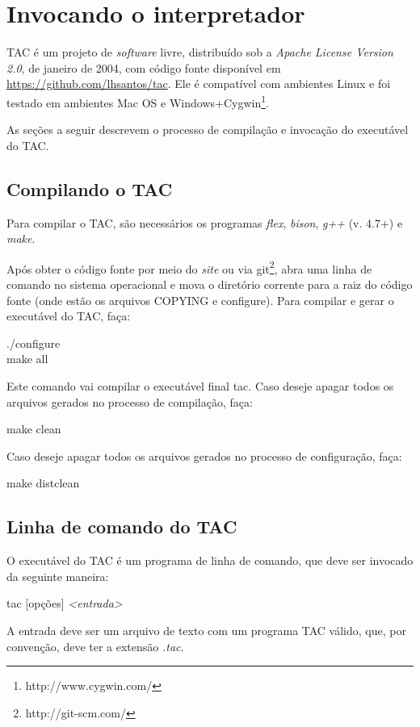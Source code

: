 \documentclass[12pt,a4paper,extrafontsizes,article]{memoir}
\newcommand*{\srcfont}{\fontfamily{pcr}\selectfont}
\begin{document}
\clearpage
\chapter{Invocando o interpretador}

TAC é um projeto de \textit{software} livre, distribuído sob a \textit{Apache License Version 2.0}, de
janeiro de 2004, com código fonte disponível em \url{https://github.com/lhsantos/tac}. Ele é compatível com
ambientes Linux e foi testado em ambientes Mac OS e Windows+Cygwin\footnote{http://www.cygwin.com/}.

As seções a seguir descrevem o processo de compilação e invocação do executável do TAC.

\section{Compilando o TAC}

Para compilar o TAC, são necessários os programas \textit{flex}, \textit{bison}, \textit{g++} (v. 4.7+) e \textit{make}.

Após obter o código fonte por meio do \textit{site} ou via {\srcfont git}\footnote{http://git-scm.com/}, abra uma linha
de comando no sistema operacional e mova o diretório corrente para a raiz do código fonte (onde estão os arquivos
{\srcfont COPYING} e {\srcfont configure}). Para compilar e gerar o executável do TAC, faça:

\bigskip
{\srcfont
./configure\\
\indent make all
}
\bigskip

Este comando vai compilar o executável final {\srcfont tac}. Caso deseje apagar todos os arquivos gerados no processo de compilação, faça:

\bigskip
{\srcfont make clean\\}

Caso deseje apagar todos os arquivos gerados no processo de configuração, faça:

\bigskip
{\srcfont make distclean}


\section{Linha de comando do TAC}

O executável do TAC é um programa de linha de comando, que deve ser invocado da seguinte maneira:

\bigskip
{\srcfont tac [opções] \textit{<entrada>}}
\bigskip

A entrada deve ser um arquivo de texto com um programa TAC válido, que, por convenção, deve ter a extensão
\textit{.tac}.
\end{document}

